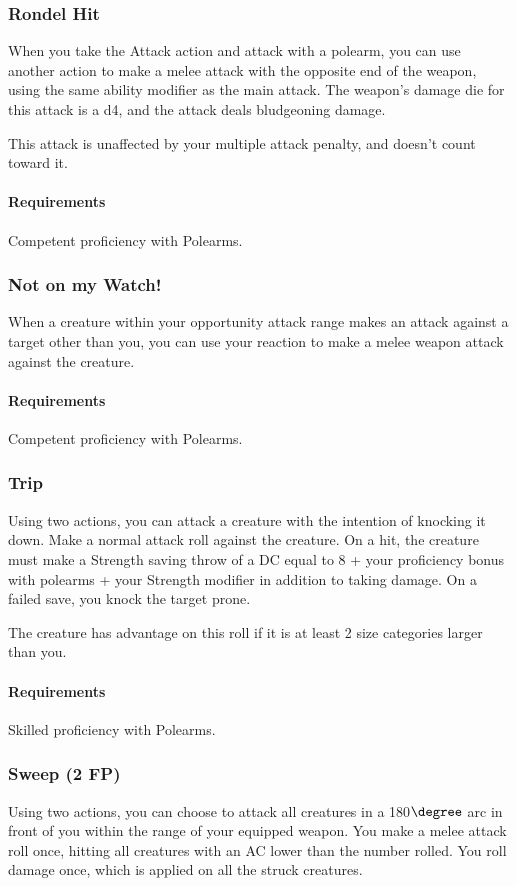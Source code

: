 \subsubsection{Rondel Hit} \label{feat::rondelhit}
    When you take the Attack action and attack with a polearm, you can use another action to make a melee attack with the opposite end of the weapon, using the same ability modifier as the main attack.
    The weapon's damage die for this attack is a d4, and the attack deals bludgeoning damage.

    This attack is unaffected by your multiple attack penalty, and doesn't count toward it.
    \paragraph{Requirements} Competent proficiency with Polearms.
\subsubsection{Not on my Watch!} \label{feat::notonmywatch}
    When a creature within your opportunity attack range makes an attack against a target other than you, you can use your reaction to make a melee weapon attack against the creature.
    \paragraph{Requirements} Competent proficiency with Polearms.
\subsubsection{Trip} \label{feat::trip}
    Using two actions, you can attack a creature with the intention of knocking it down.
    Make a normal attack roll against the creature.
    On a hit, the creature must make a Strength saving throw of a DC equal to 8 + your proficiency bonus with polearms + your Strength modifier in addition to taking damage.
    On a failed save, you knock the target prone.

    The creature has advantage on this roll if it is at least 2 size categories larger than you.
    \paragraph{Requirements} Skilled proficiency with Polearms.
\subsubsection{Sweep (2 FP)} \label{feat::sweep}
    Using two actions, you can choose to attack all creatures in a 180$\degree$ arc in front of you within the range of your equipped weapon.
    You make a melee attack roll once, hitting all creatures with an AC lower than the number rolled.
    You roll damage once, which is applied on all the struck creatures.
